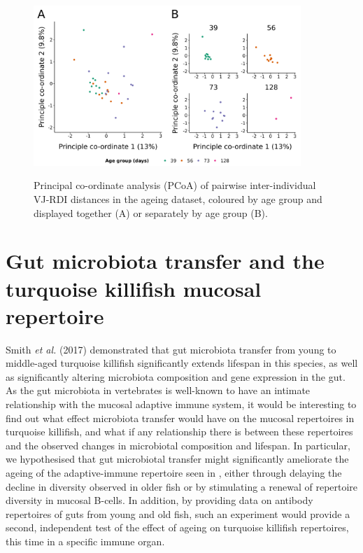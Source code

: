 \begin{figure}
\centering
\includegraphics[width = 0.9\textwidth]{_Figures/png/ageing-rdi-VJ-individual-pcoa}
\begin{subfigure}{0em}
\label{fig:igseq-ageing-rdi-VJ-individual-pcoa-all}
\end{subfigure}
\begin{subfigure}{0em}
\label{fig:igseq-ageing-rdi-VJ-individual-pcoa-facet}
\end{subfigure}
\caption{Principal co-ordinate analysis (PCoA) of pairwise inter-individual VJ-RDI distances in the \igseq ageing dataset, coloured by age group and displayed together (A) or separately by age group (B).}
\label{fig:igseq-ageing-rdi-VJ-individual-pcoa}
\end{figure}


\clearpage\newpage
\section{Gut microbiota transfer and the turquoise killifish mucosal repertoire}
\label{sec:igseq_gut}



Smith \textit{et al.} (2017) \parencite{smith2017microbiota} demonstrated that gut microbiota transfer from young to middle-aged turquoise killifish significantly extends lifespan in this species, as well as significantly altering microbiota composition and gene expression in the gut. As the gut microbiota in vertebrates is well-known to have an intimate relationship with the mucosal adaptive immune system, %
it would be interesting to find out what effect microbiota transfer would have on the mucosal repertoires in turquoise killifish, and what if any relationship there is between these repertoires and the observed changes in microbiotal composition and lifespan. In particular, we hypothesised that gut microbiotal transfer might significantly ameliorate the ageing of the adaptive-immune repertoire seen in , either through delaying the decline in diversity observed in older fish or by stimulating a renewal of repertoire diversity in mucosal B-cells. In addition, by providing data on antibody repertoires of guts from young and old fish, such an experiment would provide a second, independent test of the effect of ageing on turquoise killifish repertoires, this time in a specific immune organ.

